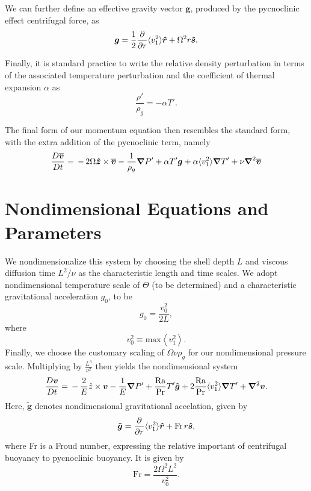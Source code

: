 We can further define an effective gravity vector $\boldsymbol{g}$, produced by the pycnoclinic effect centrifugal force, as
\begin{equation}
\boldsymbol{g} = \frac{1}{2}\frac{\partial}{\partial r}\langle v_1^2\rangle\boldsymbol{\hat{r}} + \Omega^2 r\boldsymbol{\boldsymbol{\hat{s}}}  .
\end{equation}

Finally, it is standard practice to write the relative density perturbation in terms of the associated temperature perturbation and the coefficient of thermal expansion $\alpha$ as
\begin{equation}
\label{eq:texp}
\frac{\rho'}{\rho_g}=-\alpha T'.
\end{equation}

The final form of our momentum equation then resembles the standard form, with the extra addition of the pycnoclinic term, namely
\begin{equation}
\frac{ D \vvecbar }{D t}   =  
\,-\, 2\Omega\boldsymbol{\hat{z}}\times\vvecbar 
-\frac{1}{\rho_g}\boldsymbol{\nabla}P'  %
						        +\alpha T'\boldsymbol{g}
							+\alpha \langle v_1^2\rangle\boldsymbol{\nabla}T'
+ \nu\boldsymbol{\nabla}^2\vvecbar
\end{equation}

\section{Nondimensional Equations and Parameters}
We nondimensionalize this system by choosing the shell depth $L$ and viscous diffusion time $L^2/\nu$ as the characteristic length and time scales.  We adopt nondimensional temperature scale of $\Theta$ (to be determined) and a characteristic gravitational acceleration $g_0$, to be
\begin{equation}
g_0 = \frac{v_0^2}{2 L},
\end{equation}
where 
\begin{equation}
v_0^2 \equiv \mathrm{max}\left\langle v_1^2 \right\rangle.
\end{equation}
Finally, we choose the customary scaling of $\Omega\nu\rho_g$ for our nondimensional pressure scale.  Multiplying by $\frac{L^3}{\nu^2}$ then yields the nondimensional system
\begin{equation}
\label{eq:nondim}
\frac{ D \vvec }{Dt}   = 
\,-\, \frac{2}{E}{\hat{z}}\times\vvec  
-\frac{1}{E}\boldsymbol{\nabla}P'  %
						        + \frac{\mathrm{Ra}}{\mathrm{Pr}} T' \boldsymbol{\tilde{g}}
							+2\frac{\mathrm{Ra}}{\mathrm{Pr}}\langle v_1^2\rangle\boldsymbol{\nabla} T'
+ \boldsymbol{\nabla}^2\vvec.
\end{equation}
Here, $\boldsymbol{\tilde{g}}$ denotes nondimensional gravitational accelation, given by
\begin{equation}
\boldsymbol{\tilde{g}} = \frac{\partial}{\partial r}\langle v_1^2\rangle\boldsymbol{\hat{r}} + \mathrm{Fr}\, r\boldsymbol{\boldsymbol{\hat{s}}},
\end{equation}
where Fr is a Froud number, expressing the relative important of centrifugal buoyancy to pycnoclinic buoyancy.  It is given by
\begin{equation}
\mathrm{Fr} = \frac{2\Omega^2 L^2}{v_0^2}.
\end{equation}

